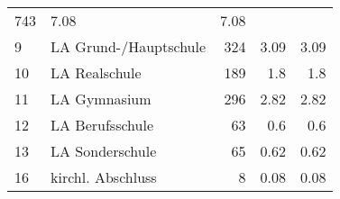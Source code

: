 \begin{longtable}{lXrrr}
       \num{743} &
       \num[round-mode=places,round-precision=2]{7.08} &
         \num[round-mode=places,round-precision=2]{7.08} \\

     9 &
     \multicolumn{1}{X}{ LA Grund-/Hauptschule   } &


       \num{324} &
       \num[round-mode=places,round-precision=2]{3.09} &
         \num[round-mode=places,round-precision=2]{3.09} \\

     10 &
     \multicolumn{1}{X}{ LA Realschule   } &


       \num{189} &
       \num[round-mode=places,round-precision=2]{1.8} &
         \num[round-mode=places,round-precision=2]{1.8} \\

     11 &
     \multicolumn{1}{X}{ LA Gymnasium   } &


       \num{296} &
       \num[round-mode=places,round-precision=2]{2.82} &
         \num[round-mode=places,round-precision=2]{2.82} \\

     12 &
     \multicolumn{1}{X}{ LA Berufsschule   } &


       \num{63} &
       \num[round-mode=places,round-precision=2]{0.6} &
         \num[round-mode=places,round-precision=2]{0.6} \\

     13 &
     \multicolumn{1}{X}{ LA Sonderschule   } &


       \num{65} &
       \num[round-mode=places,round-precision=2]{0.62} &
         \num[round-mode=places,round-precision=2]{0.62} \\

     16 &
     \multicolumn{1}{X}{ kirchl. Abschluss   } &


       \num{8} &
       \num[round-mode=places,round-precision=2]{0.08} &
         \num[round-mode=places,round-precision=2]{0.08} \\


\end{longtable}
